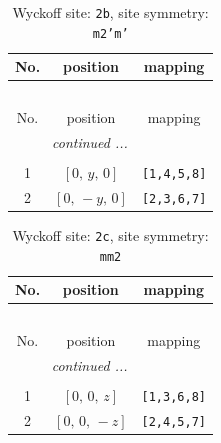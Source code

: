\documentclass[fleqn,8pt]{jsarticle}
\begin{document}
\begin{longtable}{ccc}
\caption{Wyckoff site: {\tt 2b}, site symmetry: {\tt m2'm'}}
 \\
 \hline \hline
No. & position & mapping \\ \hline \endfirsthead

\multicolumn{2}{l}{\tablename\ \thetable{}} \\
 \hline \hline
No. & position & mapping \\ \hline \endhead

 \hline \hline
\multicolumn{2}{r}{\footnotesize\it continued ...} \\ \endfoot

 \hline \hline
\multicolumn{2}{r}{} \\ \endlastfoot

1 & $\left[ 0,\, y,\, 0 \right]$ & {\tt [1,4,5,8]} \\ \hline
2 & $\left[ 0,\, - y,\, 0 \right]$ & {\tt [2,3,6,7]} \\
\end{longtable}
\renewcommand{\arraystretch}{1.2}
\begin{longtable}{ccc}
\caption{Wyckoff site: {\tt 2c}, site symmetry: {\tt mm2}}
 \\
 \hline \hline
No. & position & mapping \\ \hline \endfirsthead

\multicolumn{2}{l}{\tablename\ \thetable{}} \\
 \hline \hline
No. & position & mapping \\ \hline \endhead

 \hline \hline
\multicolumn{2}{r}{\footnotesize\it continued ...} \\ \endfoot

 \hline \hline
\multicolumn{2}{r}{} \\ \endlastfoot

1 & $\left[ 0,\, 0,\, z \right]$ & {\tt [1,3,6,8]} \\ \hline
2 & $\left[ 0,\, 0,\, - z \right]$ & {\tt [2,4,5,7]} \\
\end{longtable}
\renewcommand{\arraystretch}{1.2}
\end{document}
